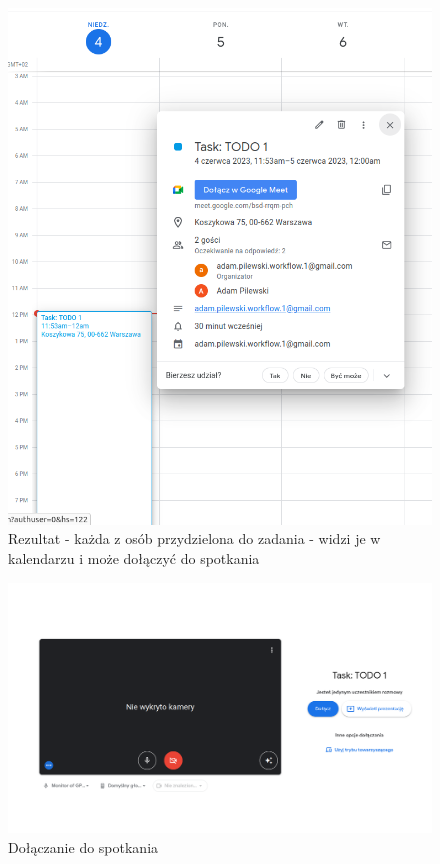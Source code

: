 \documentclass[a4paper, 12pt]{article}
\begin{document}
\begin{figure}[H]
	\centering
    \includegraphics*[scale=0.6]{img/create-task-2.png}
	\caption{Rezultat - każda z osób przydzielona do zadania - widzi je w kalendarzu i może dołączyć do spotkania}
\end{figure}
\begin{figure}[H]
	\centering
    \includegraphics*[scale=0.3]{img/google-meet.png}
	\caption{Dołączanie do spotkania}
\end{figure}
\end{document}

